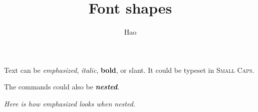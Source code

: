 \documentclass[a4paper,10pt]{article}
\title{Font shapes}
\author{Hao}
\begin{document}
\maketitle
Text can be \emph{emphasized},
\textit{italic},
\textbf{bold},
or \textsf{slant}.
It could be typeset in \textsc{Small Caps}.

The commands could also be \textbf{\textit{nested}}.

\emph{Here is how \emph{emphasized} looks when nested.}
\end{document}
